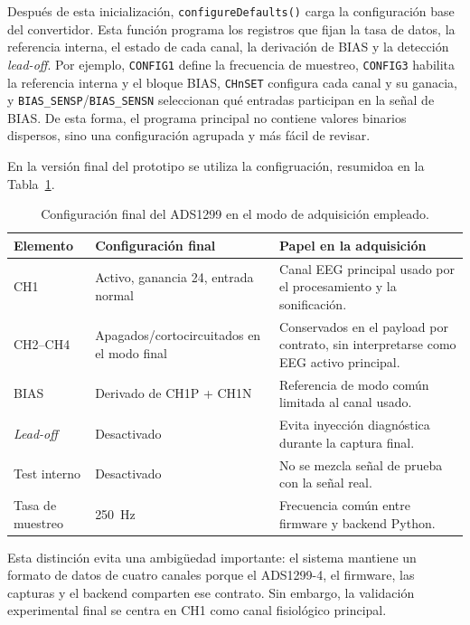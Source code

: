 \documentclass[../main.tex]{subfiles}
\begin{document}
Después de esta inicialización, \texttt{configureDefaults()} carga la configuración base del convertidor. Esta función programa los registros que fijan la tasa de datos, la referencia interna, el estado de cada canal, la derivación de BIAS y la detección \textit{lead-off}. Por ejemplo, \texttt{CONFIG1} define la frecuencia de muestreo, \texttt{CONFIG3} habilita la referencia interna y el bloque BIAS, \texttt{CHnSET} configura cada canal y su ganacia, y \texttt{BIAS\_SENSP}/\texttt{BIAS\_SENSN} seleccionan qué entradas participan en la señal de BIAS. De esta forma, el programa principal no contiene valores binarios dispersos, sino una configuración agrupada y más fácil de revisar.


En la versión final del prototipo se utiliza la configruación, resumidoa en la Tabla~\ref{tab:impl_ads1299_modo_final}.
\begin{table}[H]
    \centering
    \caption{Configuración final del ADS1299 en el modo de adquisición empleado.}
    \label{tab:impl_ads1299_modo_final}
    \begin{tabular}{p{}p{}p{}}
        \hline
        \textbf{Elemento} & \textbf{Configuración final} & \textbf{Papel en la adquisición} \\
        \hline
        CH1 & Activo, ganancia 24, entrada normal & Canal EEG principal usado por el procesamiento y la sonificación. \\
        CH2--CH4 & Apagados/cortocircuitados en el modo final & Conservados en el payload por contrato, sin interpretarse como EEG activo principal. \\
        BIAS & Derivado de CH1P + CH1N & Referencia de modo común limitada al canal usado. \\
        \textit{Lead-off} & Desactivado & Evita inyección diagnóstica durante la captura final. \\
        Test interno & Desactivado & No se mezcla señal de prueba con la señal real. \\
        Tasa de muestreo & \SI{250}{\hertz} & Frecuencia común entre firmware y backend Python. \\
        \hline
    \end{tabular}
\end{table}

Esta distinción evita una ambigüedad importante: el sistema mantiene un formato de datos de cuatro canales porque el ADS1299-4, el firmware, las capturas y el backend comparten ese contrato. Sin embargo, la validación experimental final se centra en CH1 como canal fisiológico principal.
\end{document}
